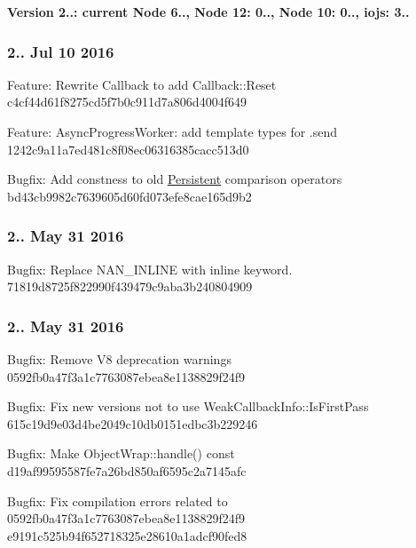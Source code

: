 {\bfseries Version 2..\+: current Node 6.., Node 12\+: 0.., Node 10\+: 0.., iojs\+: 3..}

\subsubsection*{2.. Jul 10 2016}


\begin{DoxyItemize}
\item Feature\+: Rewrite Callback to add Callback\+::\+Reset c4cf44d61f8275cd5f7b0c911d7a806d4004f649
\item Feature\+: Async\+Progress\+Worker\+: add template types for .send 1242c9a11a7ed481c8f08ec06316385cacc513d0
\item Bugfix\+: Add constness to old \hyperlink{class_persistent}{Persistent} comparison operators bd43cb9982c7639605d60fd073efe8cae165d9b2
\end{DoxyItemize}

\subsubsection*{2.. May 31 2016}


\begin{DoxyItemize}
\item Bugfix\+: Replace N\+A\+N\+\_\+\+I\+N\+L\+I\+NE with \textquotesingle{}inline\textquotesingle{} keyword. 71819d8725f822990f439479c9aba3b240804909
\end{DoxyItemize}

\subsubsection*{2.. May 31 2016}


\begin{DoxyItemize}
\item Bugfix\+: Remove V8 deprecation warnings 0592fb0a47f3a1c7763087ebea8e1138829f24f9
\item Bugfix\+: Fix new versions not to use Weak\+Callback\+Info\+::\+Is\+First\+Pass 615c19d9e03d4be2049c10db0151edbc3b229246
\item Bugfix\+: Make Object\+Wrap\+::handle() const d19af99595587fe7a26bd850af6595c2a7145afc
\item Bugfix\+: Fix compilation errors related to 0592fb0a47f3a1c7763087ebea8e1138829f24f9 e9191c525b94f652718325e28610a1adcf90fed8
\end{DoxyItemize}

